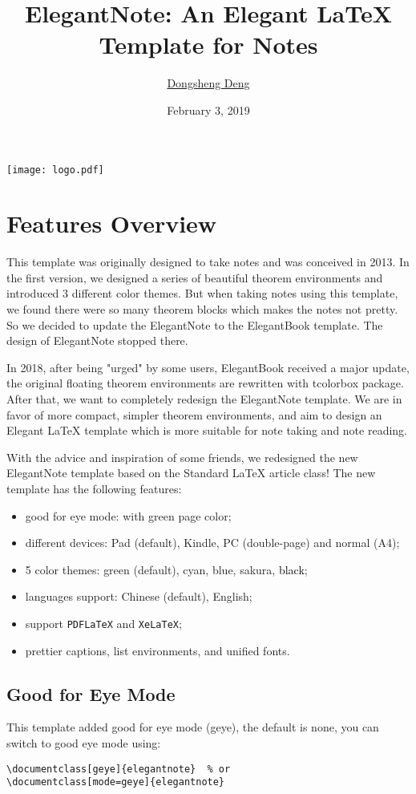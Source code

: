 \documentclass[geye,green,pad,en]{elegantnote}
\title{ElegantNote: An Elegant \LaTeX{} Template for Notes}
\author{\href{https://ddswhu.me/}{Dongsheng Deng}}
\institute{\href{https://elegantlatex.org/}{Elegant\LaTeX{} Program}}
\date{February 3, 2019}
\begin{document}
\maketitle
\centerline{\texttt{[image: logo.pdf]}}

\section{Features Overview}
This template was originally designed to take notes and was conceived in 2013. In the first version, we designed a  series of beautiful theorem environments and introduced 3 different color themes. But when taking notes using this template, we found there were so many theorem blocks which makes the notes not pretty. So we decided to update the ElegantNote to the ElegantBook template. The design of ElegantNote stopped there.

In 2018, after being "urged" by some users, ElegantBook received a major update, the original floating theorem environments are rewritten with tcolorbox package. After that, we want to completely redesign the ElegantNote template. We are in favor of more compact, simpler theorem environments, and aim to design an Elegant \LaTeX{} template which is more suitable for note taking and note reading.

With the advice and inspiration of some friends, we redesigned the new ElegantNote template based on the Standard \LaTeX{} article class! The new template has the following features:

\begin{itemize}
\item good for eye mode: with green page color;
\item different devices: Pad (default), Kindle, PC (double-page) and normal (A4);
\item 5 color themes: \textcolor{egreen}{green} (default), \textcolor{ecyan}{cyan}, \textcolor{eblue}{blue}, \textcolor{sakura}{sakura}, \textcolor{black}{black};
\item languages support: Chinese (default), English;
\item support \lstinline{PDFLaTeX} and \lstinline{XeLaTeX};
\item prettier captions, list environments, and unified fonts.
\end{itemize}

\subsection{Good for Eye Mode}
This template added good for eye mode (geye), the default is none, you can switch to good eye mode using:
\begin{lstlisting}[frame=none]  
\documentclass[geye]{elegantnote}  % or
\documentclass[mode=geye]{elegantnote}
\end{lstlisting}
\end{document}
